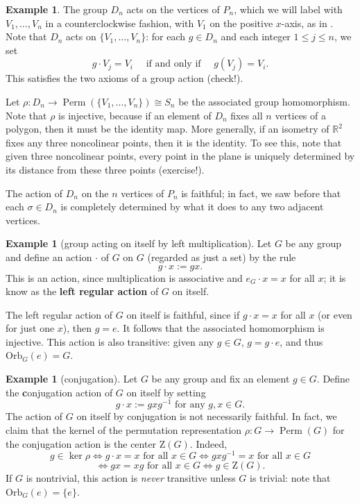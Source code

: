 \documentclass[12pt]{report}
\numberwithin{equation}{section}
\numberwithin{theorem}{chapter}
\theoremstyle{definition}
\newtheorem{example}[theorem]{Example}
\newtheorem*{basic properties}{Basic Properties}
\newtheorem*{Important Remark}{Important Remark}
\newcommand{\df}[1]{{\bf #1}\index{#1}}
\DeclareMathOperator{\Perm}{Perm}
\renewcommand{\ker}{\operatorname{ker}}
\begin{document}
\begin{example} 
The group $D_{n}$ acts on the vertices of $P_n$, which we will label with $V_1, \dots, V_{n}$ in a counterclockwise fashion, with $V_1$ on the positive $x$-axis, as in .
Note that $D_{n}$ acts on $\{V_1, \dots, V_n \}$: for each $g \in D_{n}$ and each integer $1 \leqslant j \leqslant n$, we set 
$$g \cdot V_j = V_i \quad \textrm{ if and only if } \quad g(V_j)=V_i.$$
This satisfies the two axioms of a group action (check!).

Let $\rho\!: D_{n} \to \Perm\left(\{V_1,\ldots,V_n\}\right)\cong S_n$ be the associated group homomorphism. Note that $\rho$ is injective, because if an element  of $D_{n}$ fixes all $n$ vertices of a polygon, then it must be the identity map. More generally, if an isometry of $\mathbb{R}^2$ fixes any three noncolinear points, then it is the identity. To see this, note that given three noncolinear points, every point in the plane is uniquely determined by its distance from these three points (exercise!).

The action of $D_{n}$ on the $n$ vertices of $P_n$ is faithful; in fact, we saw before that each $\sigma \in D_n$ is completely determined by what it does to any two adjacent vertices.
\end{example}


\begin{example}[group acting on itself by left multiplication]
Let $G$ be any group and define an action $\cdot$ of $G$ on $G$ (regarded as just a set) by the rule
$$g \cdot x := g  x.$$
This is an action, since multiplication is associative and $e_G \cdot x = x$ for all $x$; it is know as the \df{left regular action} of $G$ on itself.

The left regular action of $G$ on itself is faithful, since if $g \cdot x = x$ for all $x$ (or even for just one $x$), then $g = e$. It follows that the associated homomorphism is injective.
This action is also transitive: given any $g \in G$, $g = g \cdot e$, and thus $\mathrm{Orb}_G(e) = G$.
\end{example}



\begin{example}[conjugation]
Let $G$ be any group and fix an element $g \in G$. Define the {\df conjugation action} of $G$ on itself by setting
$$g\cdot x := gxg^{-1} \textrm{ for any } g,x\in G.$$
The action of $G$ on itself by conjugation is  not necessarily faithful. In fact, we claim that the kernel of the permutation representation $\rho\!:G\to \Perm(G)$ for the conjugation action is the center $\mathrm{Z}(G)$. Indeed,
$$g\in \ker\rho\iff g\cdot x=x \textrm{ for all } x\in G \iff gxg^{-1}=x \textrm{ for all } x\in G$$
$$ \iff gx=xg \textrm{ for all } x\in G \iff g\in \mathrm{Z}(G). $$
If $G$ is nontrivial, this action is \emph{never} transitive unless $G$ is trivial: note that $\mathrm{Orb}_G(e) = \{ e \}$.
\end{example}
\end{document}
